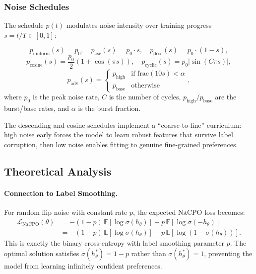 \documentclass{article}
\newcommand{\nacpo}{\textsc{NaCPO}}
\newcommand{\E}{\mathbb{E}}
\begin{document}
\subsubsection{Noise Schedules}

The schedule $p(t)$ modulates noise intensity over training progress $s = t / T \in [0, 1]$:

\begin{equation}
    p_{\text{uniform}}(s) = p_0, \quad
    p_{\text{asc}}(s) = p_0 \cdot s, \quad
    p_{\text{desc}}(s) = p_0 \cdot (1 - s),
\end{equation}
\begin{equation}
    p_{\text{cosine}}(s) = \frac{p_0}{2}\left(1 + \cos(\pi s)\right), \quad
    p_{\text{cyclic}}(s) = p_0 \left|\sin(C \pi s)\right|,
\end{equation}
\begin{equation}
    p_{\text{adv}}(s) = \begin{cases} p_{\text{high}} & \text{if } \text{frac}(10s) < \alpha \\ p_{\text{base}} & \text{otherwise} \end{cases},
\end{equation}
where $p_0$ is the peak noise rate, $C$ is the number of cycles, $p_{\text{high}}/p_{\text{base}}$ are the burst/base rates, and $\alpha$ is the burst fraction.

The descending and cosine schedules implement a ``coarse-to-fine'' curriculum: high noise early forces the model to learn robust features that survive label corruption, then low noise enables fitting to genuine fine-grained preferences.

\subsection{Theoretical Analysis}
\label{sec:theory}

\paragraph{Connection to Label Smoothing.}
For random flip noise with constant rate $p$, the expected \nacpo{} loss becomes:
\begin{align}
    \mathcal{L}_{\text{NaCPO}}(\theta) &= -(1-p)\,\E[\log \sigma(h_\theta)] - p\,\E[\log \sigma(-h_\theta)] \nonumber \\
    &= -(1-p)\,\E[\log \sigma(h_\theta)] - p\,\E[\log(1 - \sigma(h_\theta))].
    \label{eq:label_smoothing}
\end{align}
This is exactly the binary cross-entropy with label smoothing parameter $p$.
The optimal solution satisfies $\sigma(h_\theta^*) = 1 - p$ rather than $\sigma(h_\theta^*) = 1$, preventing the model from learning infinitely confident preferences.
\end{document}
